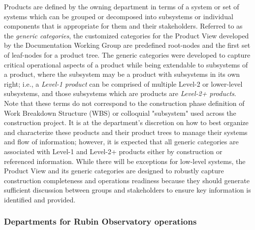 
Products are defined by the owning department in terms of a system or set of systems which can be grouped or decomposed into subsystems or individual components that is appropriate for them and their stakeholders.
Referred to as the \emph{generic categories}, the customized categories for the Product View developed by the Documentation Working Group are predefined root-nodes and the first set of leaf-nodes for a product tree.
The generic categories were developed to capture critical operational aspects of a product while being extendable to subsystems of a product, where the subsystem may be a product with subsystems in its own right; i.e., a \emph{Level-1 product} can be comprised of multiple Level-2 or lower-level subsystems, and those subsystems which are products are \emph{Level-2+ products}.
Note that these terms do not correspond to the construction phase definition of Work Breakdown Structure (WBS) or colloquial "subsystem" used across the construction project.
It is at the department's discretion on how to best organize and characterize these products and their product trees to manage their systems and flow of information; however, it is expected that all generic categories are associated with Level-1 and Level-2+ products either by construction or referenced information.
While there will be exceptions for low-level systems, the Product View and its generic categories are designed to robustly capture construction completeness and operations readiness because they should generate sufficient discussion between groups and stakeholders to ensure key information is identified and provided.


\subsubsection{Departments for Rubin Observatory operations}

